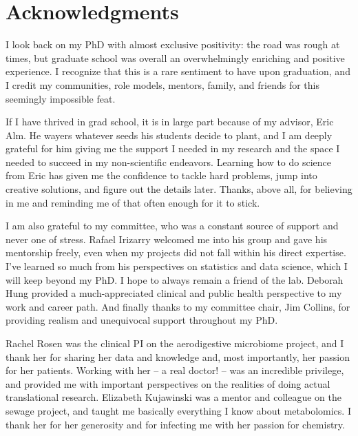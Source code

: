 \section*{Acknowledgments}

\begin{singlespace}

I look back on my PhD with almost exclusive positivity: the road was rough at times, but graduate school was overall an overwhelmingly enriching and positive experience.
I recognize that this is a rare sentiment to have upon graduation, and I credit my communities, role models, mentors, family, and friends for this seemingly impossible feat.

If I have thrived in grad school, it is in large part because of my advisor, Eric Alm.
He wayers whatever seeds his students decide to plant, and I am deeply grateful for him giving me the support I needed in my research and the space I needed to succeed in my non-scientific endeavors.
Learning how to do science from Eric has given me the confidence to tackle hard problems, jump into creative solutions, and figure out the details later.
Thanks, above all, for believing in me and reminding me of that often enough for it to stick.

I am also grateful to my committee, who was a constant source of support and never one of stress.
Rafael Irizarry welcomed me into his group and gave his mentorship freely, even when my projects did not fall within his direct expertise.
I've learned so much from his perspectives on statistics and data science, which I will keep beyond my PhD.
I hope to always remain a friend of the lab.
Deborah Hung provided a much-appreciated clinical and public health perspective to my work and career path.
And finally thanks to my committee chair, Jim Collins, for providing realism and unequivocal support throughout my PhD.

Rachel Rosen was the clinical PI on the aerodigestive microbiome project, and I thank her for sharing her data and knowledge and, most importantly, her passion for her patients.
Working with her -- a real doctor! -- was an incredible privilege, and provided me with important perspectives on the realities of doing actual translational research.
Elizabeth Kujawinski was a mentor and colleague on the sewage project, and taught me basically everything I know about metabolomics. I thank her for her generosity and for infecting me with her passion for chemistry.


\end{singlespace}
